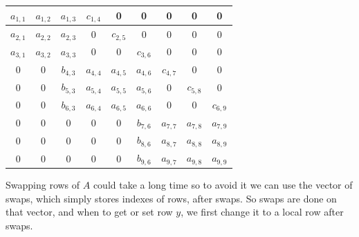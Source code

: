 \documentclass{article}
\begin{document}
\begin{center}
    \begin{tabular}{| c|c|c | c|c|c | c|c|c |}
        \hline
        \cellcolor{blue!10} $a_{1,1}$ & \cellcolor{blue!10} $a_{1,2}$ & \cellcolor{blue!10} $a_{1,3}$ & \cellcolor{blue!10} $c_{1,4}$ & \cellcolor{blue!10} 0 & \cellcolor{blue!10} 0 & \cellcolor{blue!10} 0 & 0 & 0 \\
        \hline
        \cellcolor{red!10} $a_{2,1}$ & \cellcolor{red!10} $a_{2,2}$ &\cellcolor{red!10}  $a_{2,3}$ & \cellcolor{red!10} 0 & \cellcolor{red!10} $c_{2,5}$ & \cellcolor{red!10} 0 & \cellcolor{red!10} 0 & 0 & 0\\
        \hline
        \cellcolor{green!10} $a_{3,1}$ & \cellcolor{green!10} $a_{3,2}$ & \cellcolor{green!10} $a_{3,3}$ & \cellcolor{green!10} 0 & \cellcolor{green!10} 0 & \cellcolor{green!10} $c_{3,6}$ & \cellcolor{green!10} 0 & 0 & 0\\
        \hline
        0 & 0 & \cellcolor{blue!25} $b_{4,3}$ & \cellcolor{blue!25} $a_{4,4}$ & \cellcolor{blue!25} $a_{4,5}$ & \cellcolor{blue!25} $a_{4, 6}$ & \cellcolor{blue!25} $c_{4,7}$ & \cellcolor{blue!25} 0 & \cellcolor{blue!25} 0 \\
        \hline
        0 & 0 & \cellcolor{red!25} $b_{5,3}$ & \cellcolor{red!25} $a_{5,4}$ & \cellcolor{red!25} $a_{5,5}$ & \cellcolor{red!25} $a_{5, 6}$ & \cellcolor{red!25} 0 & \cellcolor{red!25} $c_{5,8}$ & \cellcolor{red!25} 0\\
        \hline
        0 & 0 & \cellcolor{green!25}$b_{6,3}$ & \cellcolor{green!25} $a_{6,4}$ & \cellcolor{green!25} $a_{6,5}$ & \cellcolor{green!25} $a_{6, 6}$ & \cellcolor{green!25} 0 & \cellcolor{green!25} 0 & \cellcolor{green!25} $c_{6,9}$\\
        \hline
        0 & 0 & 0 & 0 & 0 & \cellcolor{blue!50} $b_{7,6}$ & \cellcolor{blue!50}$a_{7,7}$ & \cellcolor{blue!50}$a_{7,8}$ & \cellcolor{blue!50} $a_{7,9}$\\
        \hline
        0 & 0 & 0 & 0 & 0 & \cellcolor{red!50}$b_{8,6}$ & \cellcolor{red!50}$a_{8,7}$ & \cellcolor{red!50}$a_{8,8}$ & \cellcolor{red!50}$a_{8,9}$ \\
        \hline
        0 & 0 & 0 & 0 & 0 & \cellcolor{green!50}$b_{9,6}$ & \cellcolor{green!50}$a_{9,7}$ & \cellcolor{green!50}$a_{9,8}$ & \cellcolor{green!50}$a_{9,9}$ \\
        \hline
    \end{tabular}
\end{center}
Swapping rows of $A$ could take a long time so to avoid it we can use the vector of swaps, which simply stores indexes of rows, after swaps. So swaps are done on that vector, and when to get or set row $y$, we first change it to a local row after swaps.
\end{document}
